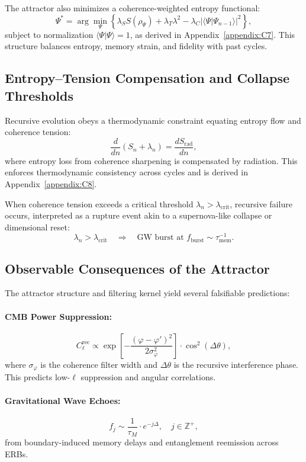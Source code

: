 The attractor also minimizes a coherence-weighted entropy functional:
\[
\Psi^* = \arg\min_{\Psi} \left\{ \lambda_S S(\rho_\Psi) + \lambda_T \lambda^2 - \lambda_C |\langle \Psi | \Psi_{n-1} \rangle|^2 \right\},
\]
subject to normalization \( \langle \Psi | \Psi \rangle = 1 \), as derived in Appendix~\ref{appendix:C7}. This structure balances entropy, memory strain, and fidelity with past cycles.

\subsection{Entropy–Tension Compensation and Collapse Thresholds}
\label{subsec:entropy-dynamics}

Recursive evolution obeys a thermodynamic constraint equating entropy flow and coherence tension:
\[
\frac{d}{dn} \left( S_n + \lambda_n \right) = \frac{dS_{\text{rad}}}{dn},
\]
where entropy loss from coherence sharpening is compensated by radiation. This enforces thermodynamic consistency across cycles and is derived in Appendix~\ref{appendix:C8}.

When coherence tension exceeds a critical threshold \( \lambda_n > \lambda_{\text{crit}} \), recursive failure occurs, interpreted as a rupture event akin to a supernova-like collapse or dimensional reset:
\[
\lambda_n > \lambda_{\text{crit}} \quad \Rightarrow \quad \text{GW burst at } f_{\text{burst}} \sim \tau_{\text{mem}}^{-1}.
\]

\subsection{Observable Consequences of the Attractor}
\label{subsec:observables}

The attractor structure and filtering kernel yield several falsifiable predictions:

\paragraph{CMB Power Suppression:}
\[
C_\ell^{\text{rec}} \propto \exp\left[-\frac{(\varphi - \varphi')^2}{2\sigma_\varphi^2}\right] \cdot \cos^2(\Delta \theta),
\]
where \( \sigma_\varphi \) is the coherence filter width and \( \Delta \theta \) is the recursive interference phase. This predicts low-\( \ell \) suppression and angular correlations.

\paragraph{Gravitational Wave Echoes:}
\[
f_j \sim \frac{1}{\tau_M} \cdot e^{-j \Delta}, \quad j \in \mathbb{Z}^+,
\]
from boundary-induced memory delays and entanglement reemission across ERBs.


